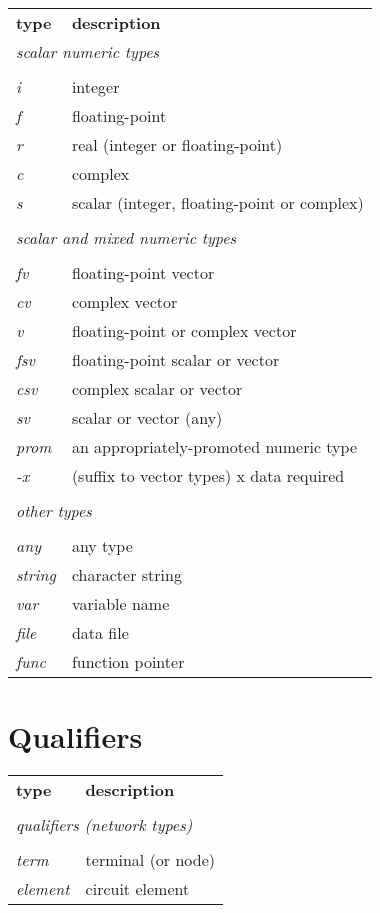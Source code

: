 \begin{tabular}{ll}
{\bf type} & {\bf description} \\
\multicolumn{2}{l}{\sl scalar numeric types} \\
\\
{\it i} & integer \\
{\it f} & floating-point \\
{\it r} & real (integer or floating-point) \\
{\it c} & complex \\
{\it s} & scalar (integer, floating-point or complex) \\
\\
\multicolumn{2}{l}{\sl scalar and mixed numeric types} \\
\\
{\it fv} & floating-point vector \\
{\it cv} & complex vector \\
{\it v} & floating-point or complex vector \\
{\it fsv} & floating-point scalar or vector \\
{\it csv} & complex scalar or vector \\
{\it sv} & scalar or vector (any) \\
{\it prom} & an appropriately-promoted numeric type \\
{\it -x} & (suffix to vector types) x data required \\
\\
\multicolumn{2}{l}{\sl other types} \\
\\
{\it any} & any type \\
{\it string} & character string \\
{\it var} & variable name \\
{\it file} & data file \\
{\it func} & function pointer
\end{tabular}

\section{Qualifiers}

\begin{tabular}{ll}
{\bf type} & {\bf description} \\
\\
\multicolumn{2}{l}{\sl qualifiers  (network types)} \\
\\
{\it term} & terminal (or node)\\
{\it element} & circuit element
\end{tabular}

